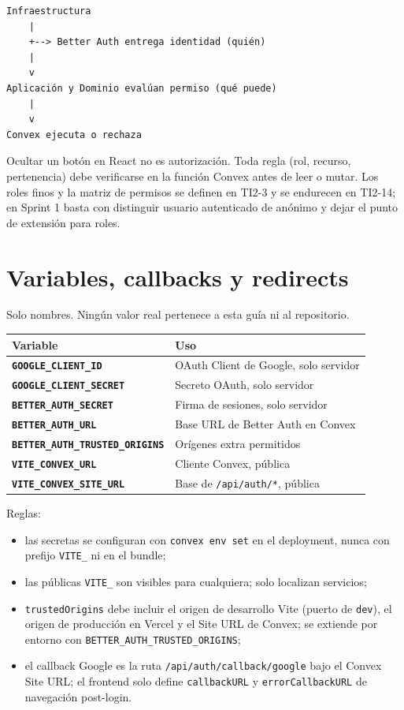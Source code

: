 \documentclass[11pt,a4paper]{article}
\begin{document}
\begin{lstlisting}
Infraestructura
    |
    +--> Better Auth entrega identidad (quién)
    |
    v
Aplicación y Dominio evalúan permiso (qué puede)
    |
    v
Convex ejecuta o rechaza
\end{lstlisting}

Ocultar un botón en React no es autorización. Toda regla (rol, recurso,
pertenencia) debe verificarse en la función Convex antes de leer o mutar.
Los roles finos y la matriz de permisos se definen en TI2-3 y se endurecen en
TI2-14; en Sprint 1 basta con distinguir usuario autenticado de anónimo y
dejar el punto de extensión para roles.

\section{Variables, callbacks y redirects}

Solo nombres. Ningún valor real pertenece a esta guía ni al repositorio.

\begin{table}[h]
  \centering
  \begin{tabularx}{\textwidth}{>{\bfseries}l X}
    \toprule
    Variable & Uso \\
    \midrule
    \texttt{GOOGLE\_CLIENT\_ID} & OAuth Client de Google, solo servidor \\
    \texttt{GOOGLE\_CLIENT\_SECRET} & Secreto OAuth, solo servidor \\
    \texttt{BETTER\_AUTH\_SECRET} & Firma de sesiones, solo servidor \\
    \texttt{BETTER\_AUTH\_URL} & Base URL de Better Auth en Convex \\
    \texttt{BETTER\_AUTH\_TRUSTED\_ORIGINS} & Orígenes extra permitidos \\
    \texttt{VITE\_CONVEX\_URL} & Cliente Convex, pública \\
    \texttt{VITE\_CONVEX\_SITE\_URL} & Base de \texttt{/api/auth/*}, pública \\
    \bottomrule
  \end{tabularx}
\end{table}

Reglas:

\begin{itemize}
  \item las secretas se configuran con \texttt{convex env set} en el
    deployment, nunca con prefijo \texttt{VITE\_} ni en el bundle;
  \item las públicas \texttt{VITE\_} son visibles para cualquiera; solo
    localizan servicios;
  \item \texttt{trustedOrigins} debe incluir el origen de desarrollo Vite
    (puerto de \texttt{dev}), el origen de producción en Vercel y el Site URL
    de Convex; se extiende por entorno con
    \texttt{BETTER\_AUTH\_TRUSTED\_ORIGINS};
  \item el callback Google es la ruta \texttt{/api/auth/callback/google} bajo
    el Convex Site URL; el frontend solo define \texttt{callbackURL} y
    \texttt{errorCallbackURL} de navegación post-login.
\end{itemize}
\end{document}
